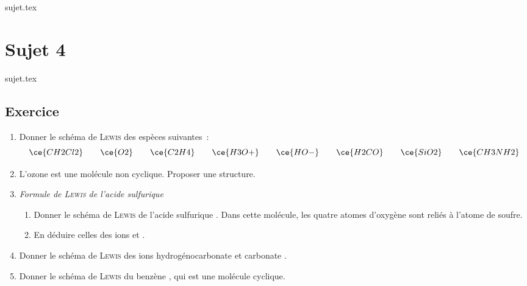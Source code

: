 \documentclass[a4paper, 11pt]{book}
\begin{document}
\resetQ
{sujet.tex}

\chapter{Sujet 4}
\resetQ
{sujet.tex}
\section{Exercice}

\resetQ
\begin{enumerate}
    \item Donner le schéma de \textsc{Lewis} des espèces suivantes~:
        \[
            \ce{CH2Cl2}
            \qquad
            \ce{O2}
            \qquad
            \ce{C2H4}
            \qquad
            \ce{H3O+}
            \qquad
            \ce{HO-}
            \qquad
            \ce{H2CO}
            \qquad
            \ce{SiO2}
            \qquad
            \ce{CH3NH2}
        \]
    \item L'ozone  est une molécule non cyclique. Proposer une structure.
    \item \textit{Formule de \textsc{Lewis} de l'acide sulfurique}
    \begin{enumerate}[]
        \item Donner le schéma de \textsc{Lewis} de l'acide sulfurique
            . Dans cette molécule, les quatre atomes d'oxygène sont
            reliés à l'atome de soufre.
        \item En déduire celles des ions  et .
    \end{enumerate}
    \item Donner le schéma de \textsc{Lewis} des ions hydrogénocarbonate
         et carbonate .
    \item Donner le schéma de \textsc{Lewis} du benzène , qui est une
        molécule cyclique.
\end{enumerate}

\label{LastPage}
\end{document}
